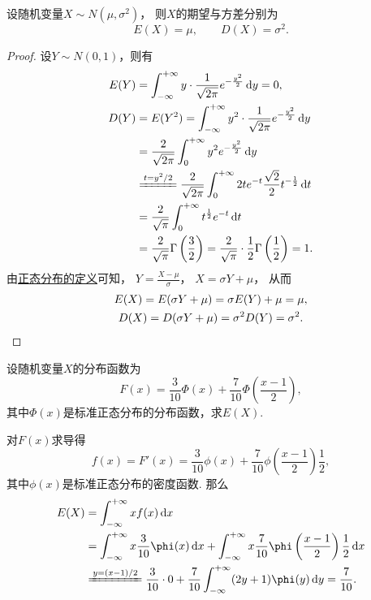 \begin{proposition}\label{theorem:随机变量的数字特征.正态分布的数字特征}
设随机变量\(X \sim N(\mu,\sigma^2)\)，
则\(X\)的期望与方差分别为\begin{equation*}
	E(X) = \mu,
	\qquad
	D(X) = \sigma^2.
\end{equation*}
\begin{proof}
设\(Y \sim N(0,1)\)，则有\begin{align*}
	E(Y) &= \int_{-\infty}^{+\infty} y \cdot \frac{1}{\sqrt{2\pi}} e^{-\frac{y^2}{2}} \dd{y}
	= 0, \\
	D(Y) &= E(Y^2)
	= \int_{-\infty}^{+\infty} y^2 \cdot \frac{1}{\sqrt{2\pi}} e^{-\frac{y^2}{2}} \dd{y} \\
	&= \frac{2}{\sqrt{2\pi}} \int_0^{+\infty} y^2 e^{-\frac{y^2}{2}} \dd{y} \\
	&\xlongequal{t=y^2/2} \frac{2}{\sqrt{2\pi}} \int_0^{+\infty} 2 t e^{-t} \frac{\sqrt{2}}{2} t^{-\frac{1}{2}} \dd{t} \\
	&=\frac{2}{\sqrt{\pi}} \int_0^{+\infty} t^{\frac{1}{2}} e^{-t} \dd{t} \\
	&= \frac{2}{\sqrt{\pi}} \Gamma\left(\frac{3}{2}\right)
	= \frac{2}{\sqrt{\pi}} \cdot \frac{1}{2} \Gamma\left(\frac{1}{2}\right)
	= 1.
\end{align*}
由\hyperref[definition:正态分布.正态分布的定义]{正态分布的定义}可知，
\(Y = \frac{X-\mu}{\sigma}\)，
\(X = \sigma Y + \mu\)，
从而\begin{gather*}
	E(X) = E(\sigma Y + \mu) = \sigma E(Y) + \mu = \mu, \\
	D(X) = D(\sigma Y + \mu) = \sigma^2 D(Y) = \sigma^2.
	\qedhere
\end{gather*}
\end{proof}
\end{proposition}

\begin{example}
设随机变量\(X\)的分布函数为\begin{equation*}
	F(x) = \frac{3}{10} \Phi(x) + \frac{7}{10} \Phi\left(\frac{x-1}{2}\right),
\end{equation*}
其中\(\Phi(x)\)是标准正态分布的分布函数，求\(E(X)\).
\begin{solution}
对\(F(x)\)求导得\begin{equation*}
	f(x) = F'(x)
	= \frac{3}{10} \phi(x)
		+ \frac{7}{10} \phi\left(\frac{x-1}{2}\right) \frac{1}{2},
\end{equation*}
其中\(\phi(x)\)是标准正态分布的密度函数.
那么\begin{align*}
	E(X) &= \int_{-\infty}^{+\infty} x f(x) \dd{x} \\
	&= \int_{-\infty}^{+\infty} x \frac{3}{10} \phi(x) \dd{x}
	+ \int_{-\infty}^{+\infty} x \frac{7}{10} \phi\left(\frac{x-1}{2}\right) \frac{1}{2} \dd{x} \\
	&\xlongequal{y=(x-1)/2} \frac{3}{10} \cdot 0
	+ \frac{7}{10} \int_{-\infty}^{+\infty} (2y+1) \phi(y) \dd{y}
	= \frac{7}{10}.
\end{align*}
\end{solution}
\end{example}

